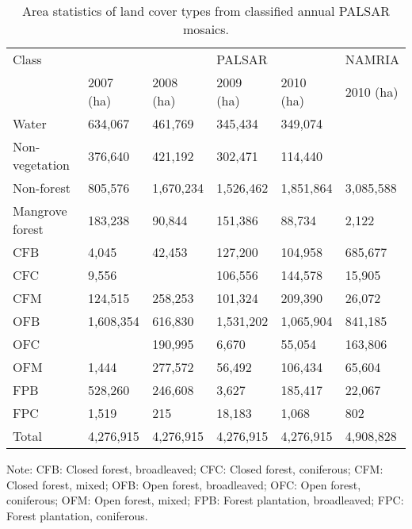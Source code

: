 \begin{spacing}{1.0}
\begin{longtable}[h!]{ p{3cm} p{2cm} p{2cm} p{2cm} p{2cm} p{2cm} }

    \caption[Area statistics of land cover types from classified annual PALSAR mosaics.]{Area statistics of land cover types from classified annual PALSAR mosaics.}
    \label{tab: result-table4.7}\\
    
    	\toprule
    	Class & {} & {} & PALSAR & {} & NAMRIA\\
    	\cmidrule{2-6}
    	{} & 2007 (ha) & 2008 (ha) & 2009 (ha) & 2010 (ha) & 2010 (ha)\\ 
    	\midrule
    	\endhead
    	
		Water & 634,067 & 461,769 & 345,434 & 349,074 & {}\\
		Non-vegetation & 376,640 & 421,192 & 302,471 & 114,440 & {}\\
		Non-forest & 805,576 & 1,670,234 & 1,526,462 & 1,851,864 & 3,085,588\\
		Mangrove forest & 183,238 & 90,844 & 151,386 & 88,734 & 2,122\\
		CFB & 4,045 & 42,453 & 127,200 & 104,958 & 685,677\\
		CFC & 9,556 & {} & 106,556 & 144,578 & 15,905\\
		CFM & 124,515 & 258,253 & 101,324 & 209,390 & 26,072\\
		OFB & 1,608,354 & 616,830 & 1,531,202 & 1,065,904 & 841,185\\
		OFC & {} & 190,995 & 6,670 & 55,054 & 163,806\\
		OFM & 1,444 & 277,572 & 56,492 & 106,434 & 65,604\\
		FPB & 528,260 & 246,608 & 3,627 & 185,417 & 22,067\\
		FPC & 1,519 & 215 & 18,183 & 1,068 & 802\\
		\midrule
		Total & 4,276,915 & 4,276,915 & 4,276,915 & 4,276,915 & 4,908,828\\
		\bottomrule
    
\end{longtable}

	\noindent Note: CFB: Closed forest, broadleaved; CFC: Closed forest, coniferous; CFM: Closed forest, mixed; OFB: Open forest, broadleaved; OFC: Open forest, coniferous; OFM: Open forest, mixed; FPB: Forest plantation, broadleaved; FPC: Forest plantation, coniferous.\\
	
\end{spacing}

